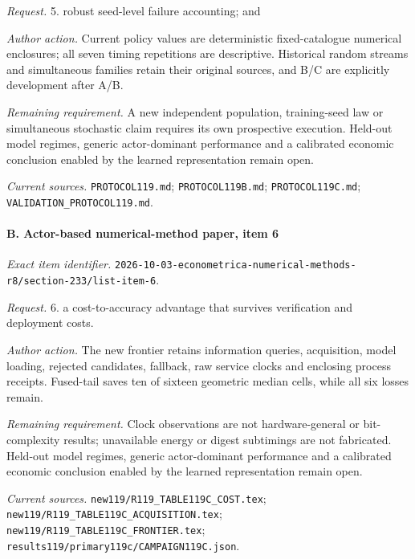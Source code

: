 \par\emph{Request.} 5. robust seed-level failure accounting; and

\par\emph{Author action.} Current policy values are deterministic fixed-catalogue numerical enclosures; all seven timing repetitions are descriptive. Historical random streams and simultaneous families retain their original sources, and B/\allowbreak{}C are explicitly development after A/\allowbreak{}B.

\par\emph{Remaining requirement.} A new independent population, training-seed law or simultaneous stochastic claim requires its own prospective execution. Held-out model regimes, generic actor-dominant performance and a calibrated economic conclusion enabled by the learned representation remain open.

\par\emph{Current sources.} \nolinkurl{PROTOCOL119.md}; \nolinkurl{PROTOCOL119B.md}; \nolinkurl{PROTOCOL119C.md}; \nolinkurl{VALIDATION_PROTOCOL119.md}.

\paragraph{B. Actor-based numerical-method paper, item 6}

\emph{Exact item identifier.} \nolinkurl{2026-10-03-econometrica-numerical-methods-r8/section-233/list-item-6}.

\par\emph{Request.} 6. a cost-to-accuracy advantage that survives verification and deployment costs.

\par\emph{Author action.} The new frontier retains information queries, acquisition, model loading, rejected candidates, fallback, raw service clocks and enclosing process receipts. Fused-tail saves ten of sixteen geometric median cells, while all six losses remain.

\par\emph{Remaining requirement.} Clock observations are not hardware-general or bit-complexity results; unavailable energy or digest subtimings are not fabricated. Held-out model regimes, generic actor-dominant performance and a calibrated economic conclusion enabled by the learned representation remain open.

\par\emph{Current sources.} \nolinkurl{new119/R119_TABLE119C_COST.tex}; \nolinkurl{new119/R119_TABLE119C_ACQUISITION.tex}; \nolinkurl{new119/R119_TABLE119C_FRONTIER.tex}; \nolinkurl{results119/primary119c/CAMPAIGN119C.json}.

